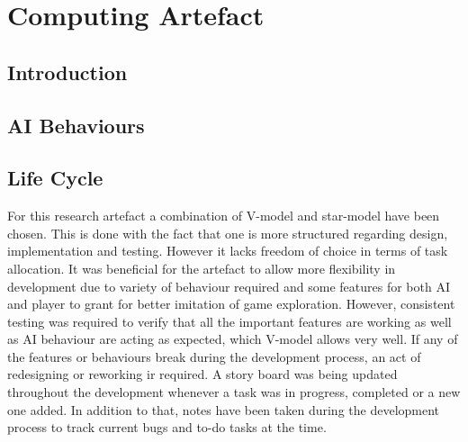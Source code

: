 \documentclass[journal]{IEEEtran}
\begin{document}
\section{Computing Artefact}
\subsection{Introduction}


\subsection{AI Behaviours}


\subsection{Life Cycle}
\cite{isaias2015information}
For this research artefact a combination of V-model and star-model have been chosen. This is done with the fact that one is more structured regarding design, implementation and testing. However it lacks freedom of choice in terms of task allocation. It was beneficial for the artefact to allow more flexibility in development due to variety of behaviour required and some features for both AI and player to grant for better imitation of game exploration. However, consistent testing was required to verify that all the important features are working as well as AI behaviour are acting as expected, which V-model allows very well. If any of the features or behaviours break during the development process, an act of redesigning or reworking ir required.
A story board was being updated throughout the development whenever a task was in progress, completed or a new one added. In addition to that, notes have been taken during the development process to track current bugs and to-do tasks at the time.
\end{document}
